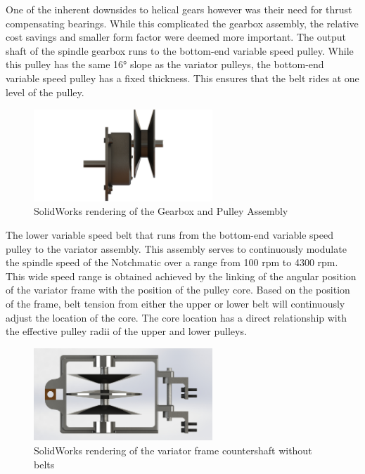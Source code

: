 One of the inherent downsides to helical gears however was their need for thrust compensating bearings. While this complicated the gearbox assembly, the relative cost savings and smaller form factor were deemed more important. The output shaft of the spindle gearbox runs to the bottom-end variable speed pulley. While this pulley has the same 16° slope as the variator pulleys, the bottom-end variable speed pulley has a fixed thickness. This ensures that the belt rides at one level of the pulley. 

\begin{figure}[H]
    \centering
    \includegraphics[width=0.6\textwidth]{./fall-report pictures/Chapter2-MachineDescription/GPA}
    \caption{SolidWorks rendering of the Gearbox and Pulley Assembly}
    \label{fig:GPA}
\end{figure}

The lower variable speed belt that runs from the bottom-end variable speed pulley to the variator assembly.  This assembly serves to continuously modulate the spindle speed of the Notchmatic over a range from 100 rpm to 4300 rpm. This wide speed range is obtained achieved by the linking of the angular position of the variator frame with the position of the pulley core. Based on the position of the frame, belt tension from either the upper or lower belt will continuously adjust the location of the core. The core location has a direct relationship with the effective pulley radii of the upper and lower pulleys.

\begin{figure}[H]
    \centering
    \includegraphics[width=0.6\textwidth]{./fall-report pictures/Chapter2-MachineDescription/VFC}
    \caption{SolidWorks rendering of the variator frame countershaft without belts}
    \label{fig:VFC}
\end{figure}

